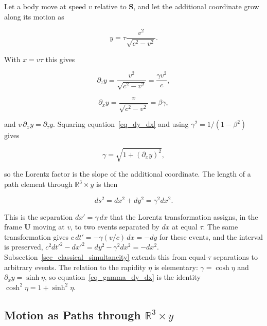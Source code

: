 \documentclass{iopjournal}
\begin{document}
Let a body move at speed $v$ relative to $\mathbf{S}$, and let the additional coordinate grow along its motion as

\begin{equation}\label{eq_dy_definition}
    y=\tau\frac{v^2}{\sqrt{c^2-v^2}} .
\end{equation}

With $x=v\tau$ this gives

\begin{equation}\label{eq_dy_dtau}
    \partial_\tau y=\frac{v^2}{\sqrt{c^2-v^2}}=\frac{\gamma v^2}{c},
\end{equation}

\begin{equation}\label{eq_dy_dx}
    \partial_x y=\frac{v}{\sqrt{c^2-v^2}}=\beta\gamma ,
\end{equation}

and $v\,\partial_x y=\partial_\tau y$. Squaring equation~\eqref{eq_dy_dx} and using $\gamma^2=1/(1-\beta^2)$ gives

\begin{equation}\label{eq_gamma_dy_dx}
    \gamma=\sqrt{1+\left(\partial_x y\right)^2},
\end{equation}

so the Lorentz factor is the slope of the additional coordinate. The length of a path element through $\mathbb{R}^3\times y$ is then

\begin{equation}\label{eq_path_length}
    ds^2=dx^2+dy^2=\gamma^2dx^2 .
\end{equation}

This is the separation $dx'=\gamma\,dx$ that the Lorentz transformation assigns, in the frame $\mathbf{U}$ moving at $v$, to two events separated by $dx$ at equal $\tau$. The same transformation gives $c\,dt'=-\gamma(v/c)\,dx=-dy$ for these events, and the interval is preserved, $c^2dt'^2-dx'^2=dy^2-\gamma^2dx^2=-dx^2$. Subsection~\ref{sec_classical_simultaneity} extends this from equal-$\tau$ separations to arbitrary events. The relation to the rapidity $\eta$ is elementary: $\gamma=\cosh\eta$ and $\partial_x y=\sinh\eta$, so equation~\eqref{eq_gamma_dy_dx} is the identity $\cosh^2\eta=1+\sinh^2\eta$.

\subsection{Motion as Paths through \texorpdfstring{$\mathbb{R}^3\times y$}{R3 x y}}\label{sec_paths}
\end{document}
